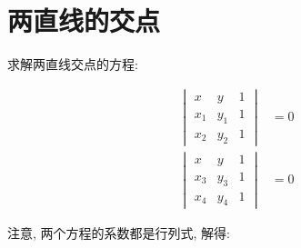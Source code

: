 \chapter{两直线的交点}

求解两直线交点的方程\cite{LINE}:

\begin{align*}
  \begin{vmatrix}
    x & y & 1\\
    x_1 & y_1 & 1\\
    x_2 & y_2 & 1
  \end{vmatrix} & = 0\\
  \begin{vmatrix}
    x & y & 1\\
    x_3 & y_3 & 1\\
    x_4 & y_4 & 1
  \end{vmatrix} & = 0
\end{align*}

注意, 两个方程的系数都是行列式, 解得:

